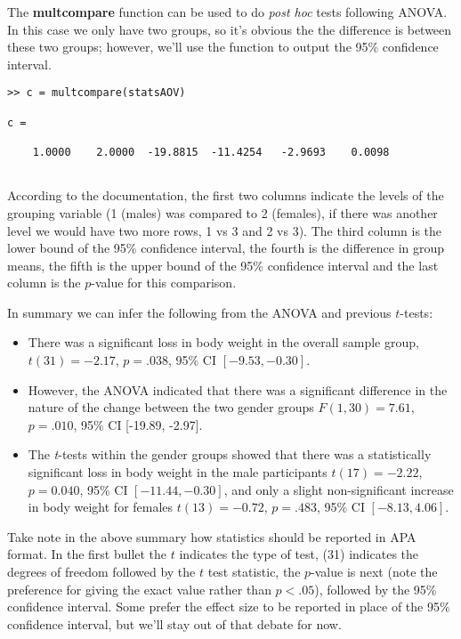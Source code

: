 \documentclass[12pt,a4paper]{article}
\begin{document}
The \textbf{multcompare} function can be used to do \emph{post hoc} tests following ANOVA.
In this case we only have two groups, so it's obvious the the difference is between these two groups; however, we'll use the function to output the 95\% confidence interval.
\begin{lstlisting}[style=Matlab-editor]	
>> c = multcompare(statsAOV)

c =

    1.0000    2.0000  -19.8815  -11.4254   -2.9693    0.0098
	
\end{lstlisting}

According to the documentation, the first two columns indicate the levels of the grouping variable (1 (males) was compared to 2 (females), if there was another level we would have two more rows, 1 vs 3 and 2 vs 3). 
The third column is the lower bound of the 95\% confidence interval, the fourth is the difference in group means, the fifth is the upper bound of the 95\% confidence interval and the last column is the $p$-value for this comparison.

In summary we can infer the following from the ANOVA and previous $t$-tests:

\begin{itemize}
	\item There was a significant loss in body weight in the overall sample group, $t(31) = -2.17$, $p = .038$, 95\% CI $[-9.53, -0.30]$.
	\item However, the ANOVA indicated that there was a significant difference in the nature of the change between the two gender groups $F(1,30) = 7.61$, $p = .010 $, 95\% CI [-19.89, -2.97].
	\item The \emph{t}-tests within the gender groups showed that there was a statistically significant loss in body weight in the male participants $t(17) = -2.22$, $p = 0.040$, 95\% CI $[-11.44, -0.30]$, and only a slight non-significant increase in body weight for females $t(13) = -0.72$, $p = .483$, 95\% CI $[-8.13, 4.06]$.
\end{itemize}

Take note in the above summary how statistics should be reported in APA format.
In the first bullet the $t$ indicates the type of test, (31) indicates the degrees of freedom followed by the $t$ test statistic, the $p$-value is next (note the preference for giving the exact value rather than $p < .05$), followed by the 95\% confidence interval.
Some prefer the effect size to be reported in place of the 95\% confidence interval, but we'll stay out of that debate for now.
\end{document}
